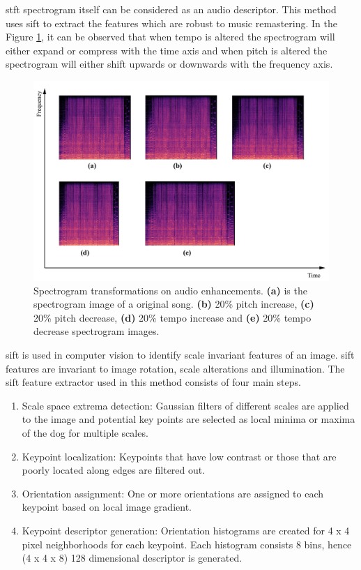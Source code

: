 \gls{stft} spectrogram itself can be considered as an audio descriptor\cite{Ke2005}. This method uses \gls{sift}\cite{Lowe2004} to extract 
the features which are robust to music remastering. In the Figure \ref{fig:compare_spectrogram}, it can be observed that when tempo is
altered the spectrogram will either expand or compress with the time axis and when pitch is altered the spectrogram will either shift upwards or 
downwards with the frequency axis. 

\begin{figure}[h]
  \centering
  \includegraphics[scale=0.4]{research_paper/graphics/spec_transform.png}
  \caption{Spectrogram transformations on audio enhancements. \textbf{(a)} is the spectrogram image of a original song. \textbf{(b)} 20\% 
  pitch increase, \textbf{(c)} 20\% pitch decrease, \textbf{(d)} 20\% tempo increase and \textbf{(e)} 20\% tempo decrease spectrogram images.}
  \label{fig:compare_spectrogram}
\end{figure}

\gls{sift} is used in computer vision to identify scale invariant features of an image. \gls{sift} features are invariant to image rotation,
scale alterations and illumination\cite{Lowe2004}. The \gls{sift} feature extractor used in this method consists of four main steps.
\begin{enumerate}
  \item Scale space extrema detection: Gaussian filters of different scales are applied to the image and potential key points are selected
  as local minima or maxima of the \gls{dog} for multiple scales.
  \item Keypoint localization: Keypoints that have low contrast or those that are poorly located along edges
  are filtered out.
  \item Orientation assignment: One or more orientations are assigned to each keypoint based on local image gradient. 
  \item Keypoint descriptor generation: Orientation histograms are created for 4 x 4 pixel neighborhoods for each keypoint.
  Each histogram consists 8 bins, hence (4 x 4 x 8) 128 dimensional descriptor is generated.
\end{enumerate}

